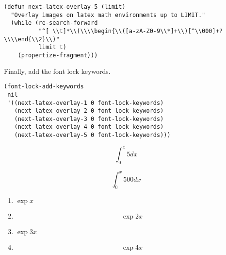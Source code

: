\documentclass[11pt]{article}
\begin{document}
\begin{verbatim}
(defun next-latex-overlay-5 (limit)
  "Overlay images on latex math environments up to LIMIT."
  (while (re-search-forward
          "^[ \\t]*\\(\\\\begin{\\([a-zA-Z0-9\\*]+\\)[^\\000]+?\\\\end{\\2}\\)"
          limit t)
    (propertize-fragment)))
\end{verbatim}

Finally, add the font lock keywords.

\begin{verbatim}
(font-lock-add-keywords
 nil
 '((next-latex-overlay-1 0 font-lock-keywords)
   (next-latex-overlay-2 0 font-lock-keywords)
   (next-latex-overlay-3 0 font-lock-keywords)
   (next-latex-overlay-4 0 font-lock-keywords)
   (next-latex-overlay-5 0 font-lock-keywords)))
\end{verbatim}



\[\int_0^x 5 dx\]

\[\int_0^x 500 dx\]

\begin{enumerate}
\item $\exp{x}$
\item $$\exp{2x}$$
\item \(\exp{3x}\)
\item \[\exp{4x}\]
\end{enumerate}
\end{document}
